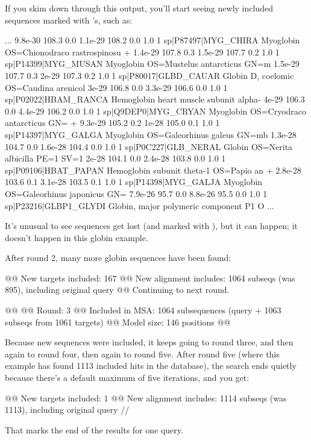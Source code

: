 If you skim down through this output, you'll start seeing newly
included sequences marked with \ccode{+}'s, such as:

\begin{sreoutput}
...
    9.8e-30  108.3   0.0    1.1e-29  108.2   0.0    1.0  1  sp|P87497|MYG_CHIRA   Myoglobin OS=Chionodraco rastrospinosu
+   1.4e-29  107.8   0.3    1.5e-29  107.7   0.2    1.0  1  sp|P14399|MYG_MUSAN   Myoglobin OS=Mustelus antarcticus GN=m
    1.5e-29  107.7   0.3      2e-29  107.3   0.2    1.0  1  sp|P80017|GLBD_CAUAR  Globin D, coelomic OS=Caudina arenicol
      3e-29  106.8   0.0    3.3e-29  106.6   0.0    1.0  1  sp|P02022|HBAM_RANCA  Hemoglobin heart muscle subunit alpha-
      4e-29  106.3   0.0    4.4e-29  106.2   0.0    1.0  1  sp|Q9DEP0|MYG_CRYAN   Myoglobin OS=Cryodraco antarcticus GN=
+   9.3e-29  105.2   0.2      1e-28  105.0   0.1    1.0  1  sp|P14397|MYG_GALGA   Myoglobin OS=Galeorhinus galeus GN=mb 
    1.3e-28  104.7   0.0    1.6e-28  104.4   0.0    1.0  1  sp|P0C227|GLB_NERAL   Globin OS=Nerita albicilla PE=1 SV=1
      2e-28  104.1   0.0    2.4e-28  103.8   0.0    1.0  1  sp|P09106|HBAT_PAPAN  Hemoglobin subunit theta-1 OS=Papio an
+   2.8e-28  103.6   0.1    3.1e-28  103.5   0.1    1.0  1  sp|P14398|MYG_GALJA   Myoglobin OS=Galeorhinus japonicus GN=
    7.9e-26   95.7   0.0    8.8e-26   95.5   0.0    1.0  1  sp|P23216|GLBP1_GLYDI Globin, major polymeric component P1 O
...
\end{sreoutput}

It's unusual to see sequences get lost (and marked with \ccode{-}),
but it can happen; it doesn't happen in this globin example.

After round 2, many more globin sequences have been found:

\begin{sreoutput}
@@ New targets included:   167
@@ New alignment includes: 1064 subseqs (was 895), including original query
@@ Continuing to next round.

@@
@@ Round:                  3
@@ Included in MSA:        1064 subsequences (query + 1063 subseqs from 1061 targets)
@@ Model size:             146 positions
@@
\end{sreoutput}

Because new sequences were included, it keeps going to round three,
and then again to round four, then again to round five. After round
five (where this example has found 1113 included hits in the
database), the search ends quietly because there's a default maximum
of five iterations, and you get:

\begin{sreoutput}
@@ New targets included:   1
@@ New alignment includes: 1114 subseqs (was 1113), including original query
//
\end{sreoutput}

That \ccode{//} marks the end of the results for one query.










